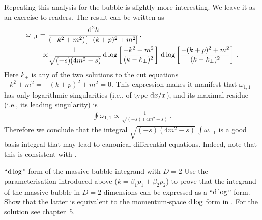 Repeating this analysis for the bubble is slightly more interesting. We leave it as an exercise to readers.
The result can be written as
\begin{align} \label{eq:bubble_dlog} \begin{aligned}
    \omega_{1,1} = \ & \frac{\mathrm{d}^2k}{(-k^2+m^2)[-(k+p)^2+m^2]}\,, \\
     \propto &  \frac{1}{\sqrt{(-s)(4m^2-s)}} \, \mathrm{d}\log\left[\frac{-k^2+m^2}{(k-k_{\pm})^2} \right] \, \mathrm{d}\log\left[\frac{-(k+p)^2+m^2}{(k-k_{\pm})^2} \right] \,.
\end{aligned} \end{align}
Here $k_{\pm}$ is any of the two solutions to the cut equations $-k^2+m^2=-(k+p)^2+m^2=0$.
This expression makes it manifest that $\omega_{1,1}$ has only logarithmic singularities (i.e., of type $\mathrm{d} x/x$), and its maximal residue (i.e., its leading singularity) is 
\begin{align}\label{massiveleadingsing}
    \oint \omega_{1,1} \propto \frac{1}{\sqrt{(-s)(4m^2-s)}} \,.
\end{align}
Therefore we conclude that the integral $ {\sqrt{(-s)(4m^2-s)}} \, \int  \omega_{1,1}$ is a good basis integral that may lead to canonical differential equations. 
Indeed, note that this is consistent with .


\begin{exer}{``$\mathrm{d} \log$'' form of the massive bubble integrand with $D=2$}
\label{Ex:4.BubbleCut}
Use the parameterisation introduced above ($k=\beta_1 p_1 + \beta_2 p_2$) to prove that the integrand of the massive bubble in $D=2$ dimensions can be expressed as a ``$\mathrm{d} \log$'' form. Show that the latter is equivalent to the momentum-space $\mathrm{d} \log$ form in . 
For the solution see \hyperref[Sol:4.BubbleCut]{chapter~5}.
\end{exer}


